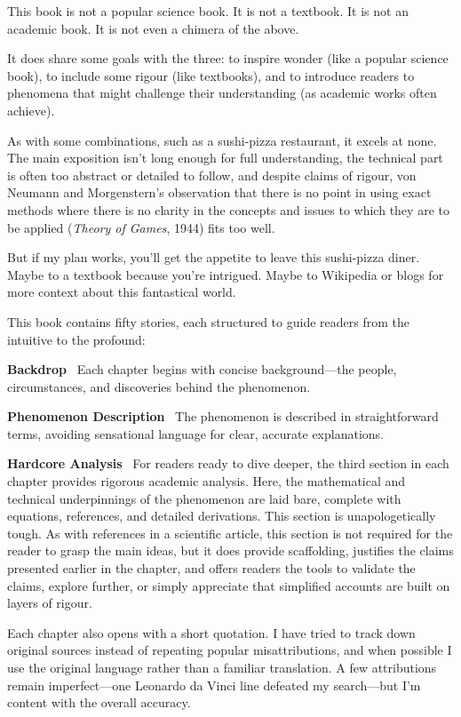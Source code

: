 

This book is not a popular science book. It is not a textbook. It is not an academic book. It is not even a chimera of the above.  

It does share some goals with the three: to inspire wonder (like a popular science book), to include some rigour (like textbooks), and to introduce readers to phenomena that might challenge their understanding (as academic works often achieve).

As with some combinations, such as a sushi-pizza restaurant, it excels at none.  
The main exposition isn't long enough for full understanding, the technical part is often too abstract or detailed to follow, and despite claims of rigour, von Neumann and Morgenstern's observation that \QENOpen{}there is no point in using exact methods where there is no clarity in the concepts and issues to which they are to be applied\QENClose{} (\textit{Theory of Games}, 1944) fits too well.

But if my plan works, you'll get the appetite to leave this sushi-pizza diner. Maybe to a textbook because you're intrigued. Maybe to Wikipedia or blogs for more context about this fantastical world.

This book contains fifty stories, each structured to guide readers from the intuitive to the profound:

\textbf{Backdrop} \ Each chapter begins with concise background—the people, circumstances, and discoveries behind the phenomenon.

\textbf{Phenomenon Description} \ The phenomenon is described in straightforward terms, avoiding sensational language for clear, accurate explanations.

\textbf{Hardcore Analysis} \ For readers ready to dive deeper, the third section in each chapter provides rigorous academic analysis. Here, the mathematical and technical underpinnings of the phenomenon are laid bare, complete with equations, references, and detailed derivations. This section is unapologetically tough. As with references in a scientific article, this section is not required for the reader to grasp the main ideas, but it does provide scaffolding, justifies the claims presented earlier in the chapter, and offers readers the tools to validate the claims, explore further, or simply appreciate that simplified accounts are built on layers of rigour.

Each chapter also opens with a short quotation. I have tried to track down original sources instead of repeating popular misattributions, and when possible I use the original language rather than a familiar translation. A few attributions remain imperfect—one Leonardo da Vinci line defeated my search—but I'm content with the overall accuracy.

